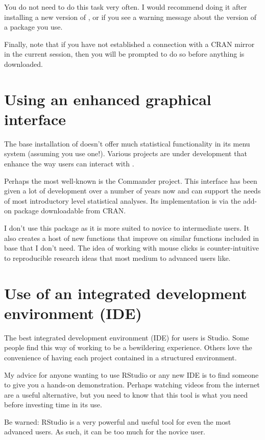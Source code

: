 You do not need to do this task very often. I would recommend doing it after installing a new version of \R{}, or if you see a warning message about the version of a package you use.

Finally, note that if you have not established a connection with a CRAN mirror in the current \R{} session, then you will be prompted to do so before anything is downloaded.

\section{Using an enhanced graphical interface}

The base installation of \R{} doesn't offer much statistical functionality in its menu system (assuming you use one!). Various projects are under development that enhance the way users can interact with \R{}.

Perhaps the most well-known is the \R{} Commander project. This interface has been given a lot of development over a number of years now and can support the needs of most introductory level statistical analyses. Its implementation is via the  add-on package downloadable from CRAN.

I don't use this package as it is more suited to novice to intermediate \R{} users. It also creates a host of new functions that improve on similar functions included in base \R{} that I don't need. The idea of working with mouse clicks is counter-intuitive to reproducible research ideas that most medium to advanced \R{} users like.

\section{Use of an integrated development environment (IDE)} 

The best integrated development environment (IDE) for \R{} users is \R{} Studio. Some people find this way of working to be a bewildering experience. Others love the convenience of having each project contained in a structured environment.

My advice for anyone wanting to use RStudio or any new IDE is to find someone to give you a hands-on demonstration. Perhaps watching videos from the internet are a useful alternative, but you need to know that this tool is what you need before investing time in its use.

Be warned: RStudio is a very powerful and useful tool for even the most advanced \R{} users. As such, it can be too much for the novice \R{} user.


